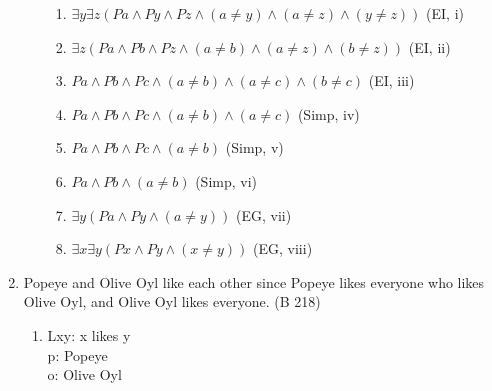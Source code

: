 \documentclass{article}
\begin{document}
\begin{enumerate}
\begin{enumerate}
\begin{enumerate}
                              \item $\exists y \exists z (Pa \land Py \land Pz \land (a \neq y) \land (a \neq z) \land (y \neq z))$ (EI, i)
                              \item $\exists z (Pa \land Pb \land Pz \land (a \neq b) \land (a \neq z) \land (b \neq z))$ (EI, ii)
                              \item $Pa \land Pb \land Pc \land (a \neq b) \land (a \neq c) \land (b \neq c)$ (EI, iii)
                              \item $Pa \land Pb \land Pc \land (a \neq b) \land (a \neq c)$ (Simp, iv)
                              \item $Pa \land Pb \land Pc \land (a \neq b)$ (Simp, v)
                              \item $Pa \land Pb \land (a \neq b)$ (Simp, vi)
                              \item $\exists y(Pa \land Py \land (a \neq y))$ (EG, vii)
                              \item $\exists x \exists y(Px \land Py \land (x \neq y))$ (EG, viii)
                        \end{enumerate}
            \end{enumerate}
      \item Popeye and Olive Oyl like each other since Popeye likes everyone who likes Olive Oyl, and Olive Oyl likes everyone. (B 218)
            \begin{enumerate}
                  \item Lxy: x likes y\\
                        p: Popeye\\
                        o: Olive Oyl\\


\end{enumerate}
\end{enumerate}
\end{document}
